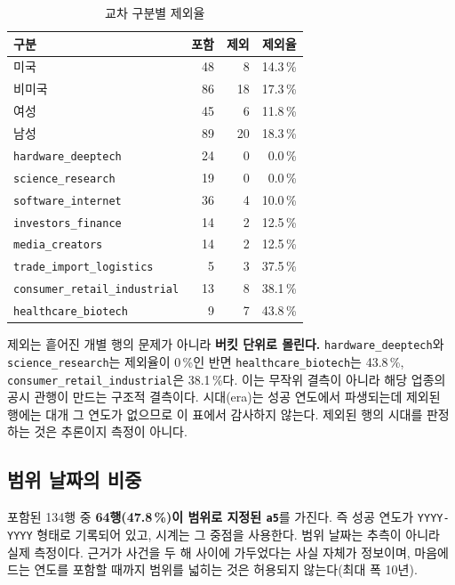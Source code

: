 \documentclass[11pt]{article}
\begin{document}
\begin{table}[h]
\centering
\caption{교차 구분별 제외율}
\begin{tabular}{L R R R}
\toprule
구분 & 포함 & 제외 & 제외율 \\
\midrule
미국   & 48 & \phantom{0}8 & 14.3\,\% \\
비미국 & 86 & 18 & 17.3\,\% \\
여성   & 45 & \phantom{0}6 & 11.8\,\% \\
남성   & 89 & 20 & 18.3\,\% \\
\midrule
\texttt{hardware\_deeptech}           & 24 & \phantom{0}0 & \phantom{0}0.0\,\% \\
\texttt{science\_research}            & 19 & \phantom{0}0 & \phantom{0}0.0\,\% \\
\texttt{software\_internet}           & 36 & \phantom{0}4 & 10.0\,\% \\
\texttt{investors\_finance}           & 14 & \phantom{0}2 & 12.5\,\% \\
\texttt{media\_creators}              & 14 & \phantom{0}2 & 12.5\,\% \\
\texttt{trade\_import\_logistics}     & \phantom{0}5 & \phantom{0}3 & 37.5\,\% \\
\texttt{consumer\_retail\_industrial} & 13 & \phantom{0}8 & 38.1\,\% \\
\texttt{healthcare\_biotech}          & \phantom{0}9 & \phantom{0}7 & 43.8\,\% \\
\bottomrule
\end{tabular}
\end{table}

제외는 흩어진 개별 행의 문제가 아니라 \textbf{버킷 단위로 몰린다.}
\texttt{hardware\_deeptech}와 \texttt{science\_research}는 제외율이 0\,\%인 반면
\texttt{healthcare\_biotech}는 43.8\,\%, \texttt{consumer\_retail\_industrial}은 38.1\,\%다.
이는 무작위 결측이 아니라 해당 업종의 공시 관행이 만드는 구조적 결측이다.
시대(era)는 성공 연도에서 파생되는데 제외된 행에는 대개 그 연도가 없으므로 이 표에서 감사하지 않는다.
제외된 행의 시대를 판정하는 것은 추론이지 측정이 아니다.

\subsection{범위 날짜의 비중}

포함된 134행 중 \textbf{64행(47.8\,\%)이 범위로 지정된 \texttt{a5}}를 가진다.
즉 성공 연도가 \texttt{YYYY-YYYY} 형태로 기록되어 있고, 시계는 그 중점을 사용한다.
범위 날짜는 추측이 아니라 실제 측정이다.
근거가 사건을 두 해 사이에 가두었다는 사실 자체가 정보이며,
마음에 드는 연도를 포함할 때까지 범위를 넓히는 것은 허용되지 않는다(최대 폭 10년).
\end{document}
